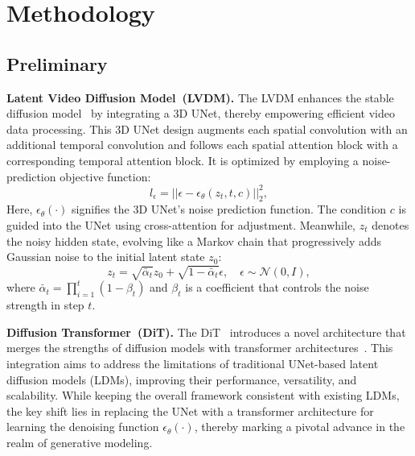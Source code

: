 
\section{Methodology}
\subsection{Preliminary}
\textbf{Latent Video Diffusion Model~(LVDM).} The LVDM enhances the stable diffusion model~\cite{ramesh2022hierarchical} by integrating a 3D UNet, thereby empowering efficient video data processing. This 3D UNet design augments each spatial convolution with an additional temporal convolution and follows each spatial attention block with a corresponding temporal attention block. It is optimized by employing a noise-prediction objective function:
\begin{equation}
    l_\epsilon = ||\epsilon - \epsilon_\theta(z_t, t, c)||^2_2,
    \label{eq:training_objective}
\end{equation}
Here, $\epsilon_\theta(\cdot)$ signifies the 3D UNet's noise prediction function. The condition 
$c$ is guided into the UNet using cross-attention for adjustment. Meanwhile, $z_t$ denotes the noisy hidden state, evolving like a Markov chain that progressively adds Gaussian noise to the initial latent state $z_0$:
\begin{equation}
    z_t=\sqrt{\bar{\alpha}_t}z_0 + \sqrt{1 - \bar{\alpha}_t}\epsilon, \quad\epsilon \sim \mathcal{N}(0, I),
    \label{eq:add_noise}
\end{equation}
where $\bar{\alpha}_t = \prod_{i=1}^t(1-\beta_t)$ and $\beta_t$ is a coefficient that controls the noise strength in step $t$.


\noindent \textbf{Diffusion Transformer~(DiT).} The DiT~\cite{peebles2023scalable} introduces a novel architecture that merges the strengths of diffusion models with transformer architectures~\cite{DBLP:conf/nips/VaswaniSPUJGKP17}.  This integration aims to address the limitations of traditional UNet-based latent diffusion models (LDMs), improving their performance, versatility, and scalability. While keeping the overall framework consistent with existing LDMs, the key shift lies in replacing the UNet with a transformer architecture for learning the denoising function $\epsilon_\theta(\cdot)$, thereby marking a pivotal advance in the realm of generative modeling.


